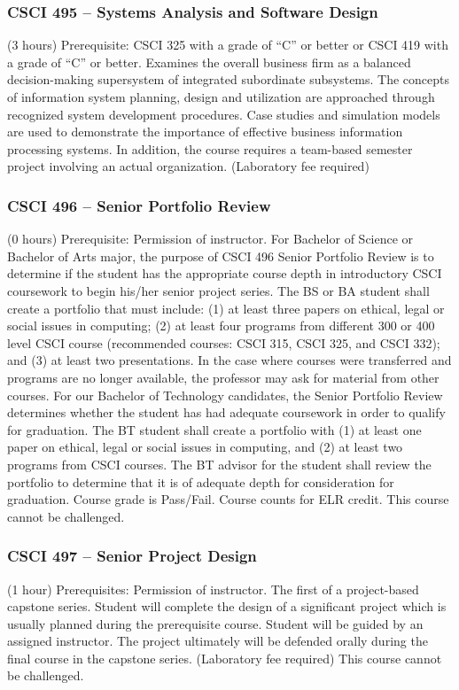 \subsubsection{CSCI 495 -- Systems Analysis and Software Design}%
\label{course:CSCI:495}
(3 hours) Prerequisite: CSCI 325 with a grade of “C” or better or CSCI 419 with a grade of “C” or better. Examines the overall business firm as a balanced decision-making supersystem of integrated subordinate subsystems. The concepts of information system planning, design and utilization are approached through recognized system development procedures. Case studies and simulation models are used to demonstrate the importance of effective business information processing systems. In addition, the course requires a team-based semester project involving an actual organization. (Laboratory fee required)

\subsubsection{CSCI 496 -- Senior Portfolio Review}%
\label{course:CSCI:496}
(0 hours) Prerequisite: Permission of instructor. For Bachelor of Science or Bachelor of Arts major, the purpose of CSCI 496 Senior Portfolio Review is to determine if the student has the appropriate course depth in introductory CSCI coursework to begin his/her senior project series. The BS or BA student shall create a portfolio that must include: (1) at least three papers on ethical, legal or social issues in computing; (2) at least four programs from different 300 or 400 level CSCI course (recommended courses: CSCI 315, CSCI 325, and CSCI 332); and (3) at least two presentations. In the case where courses were transferred and programs are no longer available, the professor may ask for material from other courses. For our Bachelor of Technology candidates, the Senior Portfolio Review determines whether the student has had adequate coursework in order to qualify for graduation. The BT student shall create a portfolio with (1) at least one paper on ethical, legal or social issues in computing, and (2) at least two programs from CSCI courses. The BT advisor for the student shall review the portfolio to determine that it is of adequate depth for consideration for graduation. Course grade is Pass/Fail. Course counts for ELR credit. This course cannot be challenged.

\subsubsection{CSCI 497 -- Senior Project Design}%
\label{course:CSCI:497}
(1 hour) Prerequisites: Permission of instructor. The first of a project-based capstone series. Student will complete the design of a significant project which is usually planned during the prerequisite course. Student will be guided by an assigned instructor. The project ultimately will be defended orally during the final course in the capstone series. (Laboratory fee required) This course cannot be challenged.

